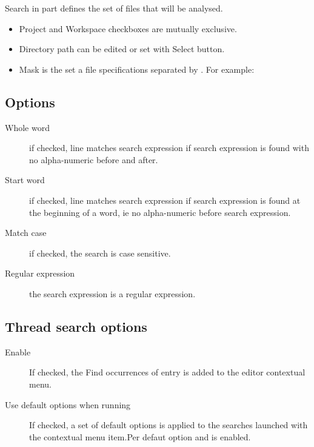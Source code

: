 Search in part defines the set of files that will be analysed.

\begin{itemize}
\item Project and Workspace checkboxes are mutually exclusive.
\item Directory path can be edited or set with Select button.
\item Mask is the set a file specifications separated by \samp{;}. For example: 
\end{itemize}

\subsection{Options}

\begin{description}
\item[Whole word] if checked, line matches search expression if search expression is found with no alpha-numeric  before and after.
\item[Start word] if checked, line matches search expression if search expression is found at the beginning of a word, ie no alpha-numeric  before search expression.
\item[Match case] if checked, the search is case sensitive.
\item[Regular expression] the search expression is a regular expression.
\end{description}


\subsection{Thread search options}

\begin{description}
\item[Enable ] If checked, the Find occurrences of  entry is added to the editor contextual menu.
\item[Use default options when running ] If checked, a set of default options is applied to the searches launched with the  contextual menu item.Per defaut option  and  is enabled.
\end{description}


